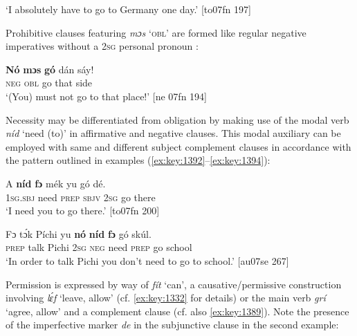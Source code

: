 \glt ‘I absolutely have to go to Germany one day.’ [to07fn 197]
\z


\z

Prohibitive clauses featuring \textit{mɔs} ‘\textsc{obl}’ are formed like regular negative imperatives without a \textsc{2sg} personal pronoun :


\ea%
    \label{ex:key:423}
    \gll \textbf{Nó}  \textbf{mɔs}    \textbf{gó}  dán    sáy!  \\
\textsc{neg}  \textsc{obl}    go  that    side  \\

\glt ‘(You) must not go to that place!’ [ne 07fn 194]
\z

Necessity may be differentiated from obligation by making use of the modal verb \textit{níd} ‘need (to)’ in affirmative  and negative  clauses. This modal auxiliary can be employed with same and different subject complement clauses in accordance with the pattern outlined in examples (\ref{ex:key:1392}–\ref{ex:key:1394}): 


\ea%
    \label{ex:key:424}
    \gll \MakeUppercase{A}   \textbf{níd}    \textbf{fɔ} mék    yu  gó  dé.\\
\textsc{1sg.sbj}  need  \textsc{prep}  \textsc{sbjv}    \textsc{2sg}  go  there\\

\glt ‘I need you to go there.’ [to07fn 200]
\z


\ea%
    \label{ex:key:425}
    \gll Fɔ  tɔ́k  Píchi  yu \textbf{nó}  \textbf{níd}    \textbf{fɔ} gó  skúl.\\
\textsc{prep}  talk  Pichi  \textsc{2sg}  \textsc{neg}  need  \textsc{prep}  go  school\\

\glt ‘In order to talk Pichi you don’t need to go to school.’ [au07se 267]
\z

Permission is expressed by way of \textit{fít} ‘can’, a causative/permissive construction involving \textit{lɛ́f} ‘leave, allow’ (cf. \ref{ex:key:1332} for details) or the main verb \textit{grí} ‘agree, allow’ and a complement clause {\fff} (cf. also \ref{ex:key:1389}). Note the presence of the imperfective marker \textit{de} in the subjunctive clause in the second example: {\fff}


